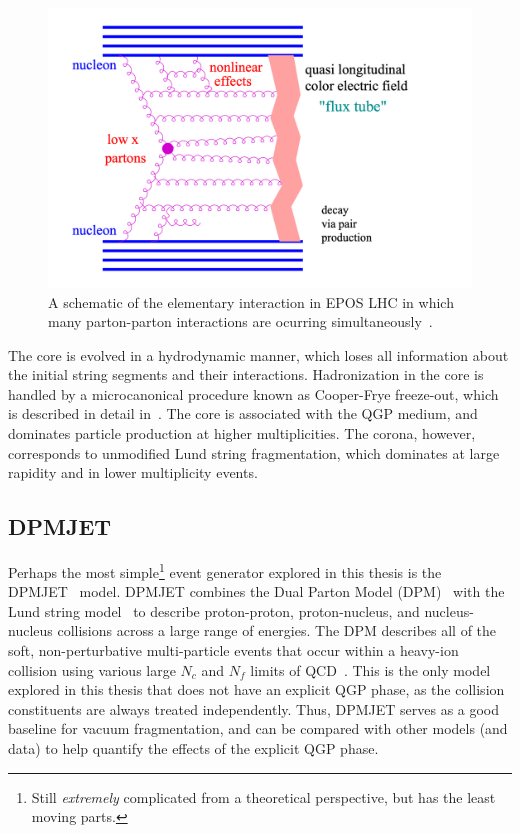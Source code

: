 \begin{figure}[ht]
    \centering
    \includegraphics[width=0.7\linewidth]{figures/introduction/epos_interaction.png}
    \caption{A schematic of the elementary interaction in EPOS LHC in which many parton-parton interactions are ocurring simultaneously~\cite{EPOSLHC}.}
    \label{fig:parton_ladder}
\end{figure}

The core is evolved in a hydrodynamic manner, which loses all information about the initial string segments and their interactions. Hadronization in the core is handled by a microcanonical procedure known as Cooper-Frye freeze-out, which is described in detail in~\cite{CooperFrye}. The core is associated with the QGP medium, and dominates particle production at higher multiplicities. The corona, however, corresponds to unmodified Lund string fragmentation, which dominates at large rapidity and in lower multiplicity events. 

\subsection{DPMJET}

Perhaps the most simple\footnote{Still \textit{extremely} complicated from a theoretical perspective, but has the least moving parts.} event generator explored in this thesis is the DPMJET~\cite{DPMJET} model. DPMJET combines the Dual Parton Model (DPM)~\cite{DPM} with the Lund string model~\cite{LundString} to describe proton-proton, proton-nucleus, and nucleus-nucleus collisions across a large range of energies. The DPM describes all of the soft, non-perturbative multi-particle events that occur within a heavy-ion collision using various large $N_c$ and $N_f$ limits of QCD~\cite{DPM}. This is the only model explored in this thesis that does not have an explicit QGP phase, as the collision constituents are always treated independently. Thus, DPMJET serves as a good baseline for vacuum fragmentation, and can be compared with other models (and data) to help quantify the effects of the explicit QGP phase.